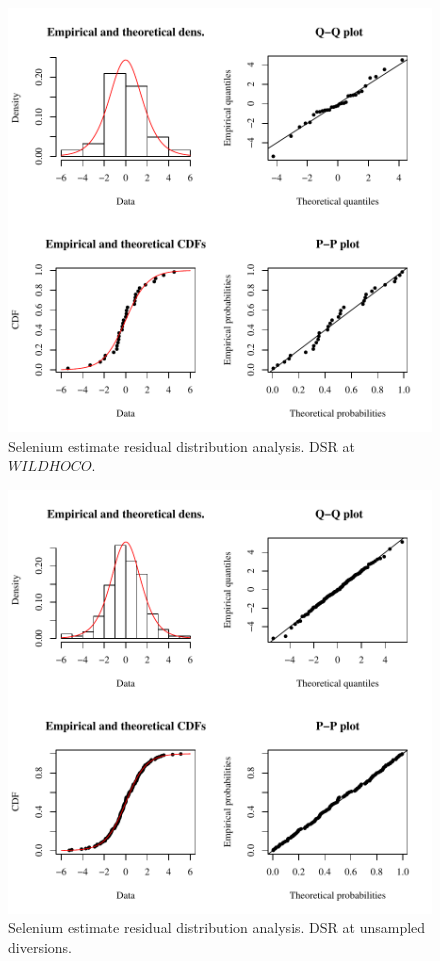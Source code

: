 \begin{figure}[htbp]
	\begin{center}
	\includegraphics[width=6in]{"Figures/Results_DSR/Conc Model res-fit WIL"}
	\caption{Selenium estimate residual distribution analysis.  DSR at $WILDHOCO$.}
	\end{center}
\end{figure}
\newpage

\begin{figure}[htbp]
	\begin{center}
	\includegraphics[width=6in]{"Figures/Results_DSR/Conc Model res-fit DDIV"}
	\caption{Selenium estimate residual distribution analysis.  DSR at unsampled diversions.}
	\end{center}
\end{figure}
\newpage